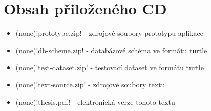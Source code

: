 \chapter{Obsah přiloženého CD} \label{app:cd-content}
\begin{itemize}
    \item \ctulst(none)!prototype.zip! - zdrojové soubory prototypu aplikace
    \item \ctulst(none)!db-scheme.zip! - databázové schéma ve formátu turtle
    \item \ctulst(none)!test-dataset.zip! - testovací dataset ve formátu turtle
    \item \ctulst(none)!text-source.zip! - zdrojové soubory textu
    \item \ctulst(none)!thesis.pdf! - elektronická verze tohoto textu
\end{itemize}